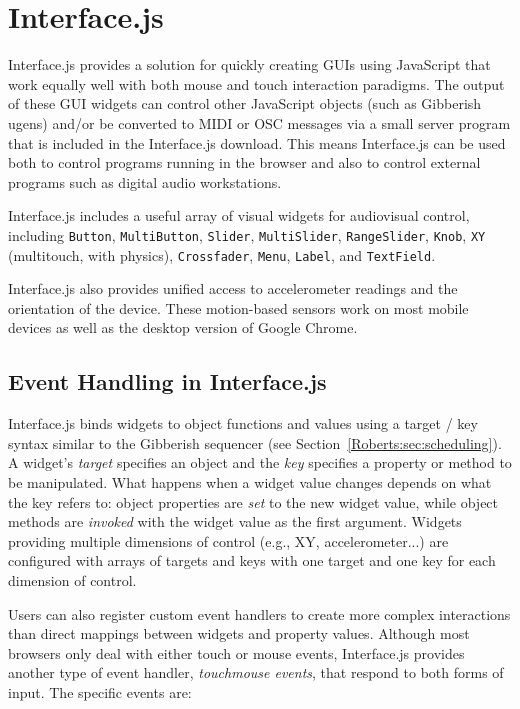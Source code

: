 \section{Interface.js}

Interface.js provides a solution for quickly creating GUIs using JavaScript that work equally well with both mouse and touch interaction paradigms. The output of these GUI widgets can control other JavaScript objects (such as Gibberish ugens) and/or be converted to MIDI or OSC \cite{Wright:2005} messages via a small server program that is included in the Interface.js download. This means Interface.js can be used both to control programs running in the browser and also to control external programs such as digital audio workstations.

Interface.js includes a useful array of visual widgets for audiovisual control, including \texttt{Button}, \texttt{MultiButton}, \texttt{Slider}, \texttt{MultiSlider}, \texttt{RangeSlider}, \texttt{Knob}, \texttt{XY} (multitouch, with physics),  \texttt{Crossfader}, \texttt{Menu}, \texttt{Label}, and \texttt{TextField}.

Interface.js also provides unified access to accelerometer readings and the orientation of the device. These motion-based sensors work on most mobile devices as well as the desktop version of Google Chrome.

\subsection{Event Handling in Interface.js}

Interface.js binds widgets to object functions and values using a target / key syntax similar to the Gibberish sequencer (see Section~\ref{Roberts:sec:scheduling}). A widget's \emph{target} specifies an object and the \emph{key} specifies a property or method to be manipulated. What happens when a widget value changes depends on what the key refers to: object properties are \emph{set} to the new widget value, while object methods are \emph{invoked} with the widget value as the first argument. Widgets providing multiple dimensions of control (e.g., XY, accelerometer...) are configured with arrays of targets and keys with one target and one key for each dimension of control.

Users can also register custom event handlers to create more complex interactions than direct mappings between widgets and property values. Although most browsers only deal with either touch or mouse events, Interface.js provides another type of event handler, \emph{touchmouse events}, that respond to both forms of input. The specific events are:

